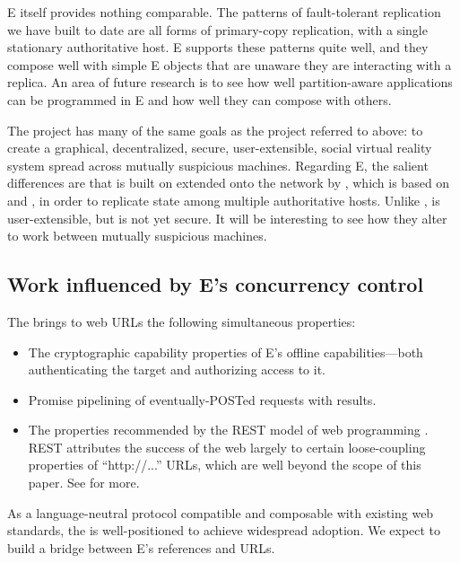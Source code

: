 \documentclass{llncs}
\begin{document}
E itself provides nothing comparable. The patterns of fault-tolerant
replication we have built to date are all forms of primary-copy
replication, with a single stationary authoritative host. E supports
these patterns quite well, and they compose well with simple E objects
that are unaware they are interacting with a replica. An area of
future research is to see how well partition-aware applications can be
programmed in E and how well they can compose with others.

 The  project has
many of the same goals as the  project referred to
above: to create a graphical, decentralized, secure, user-extensible,
social virtual reality system spread across mutually suspicious
machines. Regarding E, the salient differences are that 
is built on  extended onto the network by
, which is based on  \cite{reed:namos} and
 \cite{lamport:paxos}, in order to replicate state among
multiple authoritative hosts. Unlike ,  is
user-extensible, but is not yet secure. It will be interesting to see
how they alter  to work between mutually suspicious
machines.

\subsection{Work influenced by E's concurrency control}

 The  \cite{tyler:webcalc}
brings to web URLs the following simultaneous properties:
%
\begin{itemize}
\item The cryptographic capability properties of E's offline
  capabilities---both authenticating the target and authorizing access
  to it.
\item Promise pipelining of eventually-POSTed requests with results.
\item The properties recommended by the REST model of web programming
  \cite{fielding:rest}. REST attributes the success of the web largely
  to certain loose-coupling properties of ``http://...''  URLs, which
  are well beyond the scope of this paper. See
  \cite{fielding:rest,tyler:webcalc} for more.
\end{itemize}
%
As a language-neutral protocol compatible and composable with existing
web standards, the  is well-positioned 
to achieve widespread adoption. We expect to build a bridge between
E's references and  URLs.
\end{document}
